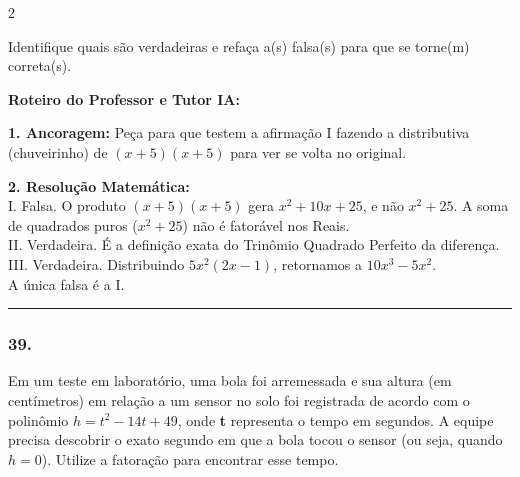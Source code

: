 \begin{multicols*}{2}
\begin{enunciadoLiteral}
Identifique quais são verdadeiras e refaça a(s) falsa(s) para que se torne(m) correta(s).
\end{enunciadoLiteral}

\ifgabarito
    \begin{tcolorbox}[colback=CorTitUm!5, colframe=CorTitUm, boxrule=1pt, arc=4pt, left=6pt, right=6pt, top=6pt, bottom=6pt]
    \small\textbf{\textcolor{CorTitUm}{Roteiro do Professor e Tutor IA:}}\par\vspace{0.1cm}
    \color{CinzaEscuro}
    \textbf{1. Ancoragem:} Peça para que testem a afirmação I fazendo a distributiva (chuveirinho) de $(x+5)(x+5)$ para ver se volta no original.\par\vspace{0.1cm}
    \textbf{2. Resolução Matemática:}\\
    I. Falsa. O produto $(x + 5)(x + 5)$ gera $x^2 + 10x + 25$, e não $x^2 + 25$. A soma de quadrados puros ($x^2 + 25$) não é fatorável nos Reais.\\
    II. Verdadeira. É a definição exata do Trinômio Quadrado Perfeito da diferença.\\
    III. Verdadeira. Distribuindo $5x^2(2x - 1)$, retornamos a $10x^3 - 5x^2$.\\
    A única falsa é a I.
    \end{tcolorbox}
\fi

\par\vspace{\espacoQuestao}

\noindent\textcolor{CorLinha}{\rule{\linewidth}{0.5pt}} 
\par\vspace{\espacoPreQuestao}
\subsubsection*{39.} 
\begin{enunciadoLiteral}
Em um teste em laboratório, uma bola foi arremessada e sua altura (em centímetros) em relação a um sensor no solo foi registrada de acordo com o polinômio $h = t^2 - 14t + 49$, onde \textbf{t} representa o tempo em segundos. 
A equipe precisa descobrir o exato segundo em que a bola tocou o sensor (ou seja, quando $h = 0$). Utilize a fatoração para encontrar esse tempo.
\end{enunciadoLiteral}


\end{multicols*}
